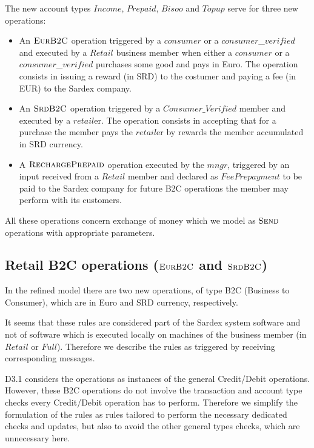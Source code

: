 The new account types $Income$, $Prepaid$, $Bisoo$ and $Topup$ serve for three new operations:
\begin{itemize}
	\item An $\hbox{\sc EurB2C}$ operation triggered by a $consumer$ or a $consumer$\_$verified$ and executed by a $Retail$ business member when either a $consumer$ or a $consumer$\_$verified$ purchases some good and pays in Euro. The operation consists in issuing a reward (in SRD) to the costumer and paying a fee (in EUR) to the Sardex company.
		
	\item An $\hbox{\sc SrdB2C}$ operation triggered by a $Consumer\_Verified$ member and executed by a $retail$er. The operation consists in accepting that for a purchase the member pays the $retail$er by rewards the member accumulated in SRD currency. 
	
	\item  A $\hbox{\sc RechargePrepaid}$ operation executed by the $mngr$, triggered by an input received from a $Retail$ member and declared as $FeePrepayment$ to be paid to the Sardex company for future B2C operations the member may perform with its customers.
	\end{itemize}
All these operations concern exchange of money which we model as $\hbox{\sc Send}$ operations with appropriate parameters.


\subsection{Retail B2C operations ($\hbox{\sc EurB2C}$ and $\hbox{\sc SrdB2C}$)}
\label{sect:eurob2c}

In the refined model there are two new operations, of type B2C (Business to 
Consumer), which are in Euro and SRD currency, respectively.

It seems that these rules are considered part of the Sardex system software and not of software which is executed locally on machines of the business member (in $Retail$ or $Full$). Therefore we describe the rules as triggered by receiving corresponding messages.

D3.1 considers the operations as instances of the general Credit/Debit operations. However, these B2C operations do not involve the transaction and account type checks every Credit/Debit operation has to perform. Therefore we simplify the formulation of the rules as rules tailored to perform the necessary dedicated checks and updates, but also to avoid the other general types checks, which are unnecessary here. 

